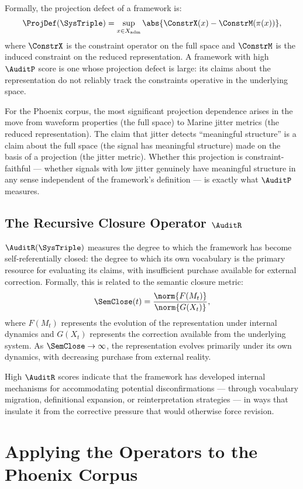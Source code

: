 Formally, the projection defect of a framework is:
\[
  \ProjDef(\SysTriple) = \sup_{x \in X_{\mathrm{adm}}}
  \abs{\ConstrX(x) - \ConstrM(\pi(x))},
\]
where $\ConstrX$ is the constraint operator on the
full space and $\ConstrM$ is the induced constraint
on the reduced representation. A framework with high
$\AuditP$ score is one whose projection defect is
large: its claims about the representation do not
reliably track the constraints operative in the
underlying space.

For the Phoenix corpus, the most significant projection
dependence arises in the move from waveform properties
(the full space) to Marine jitter metrics (the
reduced representation). The claim that jitter
detects ``meaningful structure'' is a claim about
the full space (the signal has meaningful structure)
made on the basis of a projection (the jitter
metric). Whether this projection is constraint-faithful
--- whether signals with low jitter genuinely have
meaningful structure in any sense independent of
the framework's definition --- is exactly what
$\AuditP$ measures.

\subsection{The Recursive Closure Operator \texorpdfstring{$\AuditR$}{R}}
\label{subsec:recursive-closure}

$\AuditR(\SysTriple)$ measures the degree to which
the framework has become self-referentially closed:
the degree to which its own vocabulary is the
primary resource for evaluating its claims, with
insufficient purchase available for external
correction. Formally, this is related to the
semantic closure metric:
\[
  \SemClose(t)
  = \frac{\norm{F(M_t)}}{\norm{G(X_t)}},
\]
where $F(M_t)$ represents the evolution of the
representation under internal dynamics and $G(X_t)$
represents the correction available from the underlying
system. As $\SemClose \to \infty$, the representation
evolves primarily under its own dynamics, with
decreasing purchase from external reality.

High $\AuditR$ scores indicate that the framework
has developed internal mechanisms for accommodating
potential disconfirmations --- through vocabulary
migration, definitional expansion, or reinterpretation
strategies --- in ways that insulate it from the
corrective pressure that would otherwise force revision.

\section{Applying the Operators to the Phoenix Corpus}
\label{sec:applying-operators}

